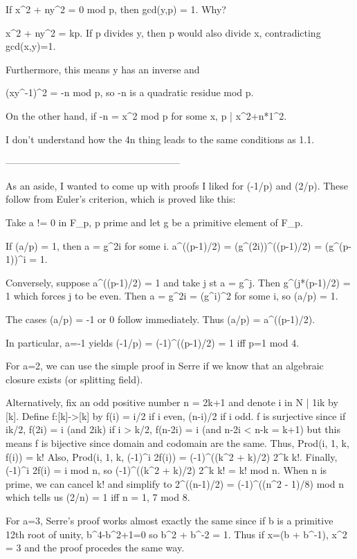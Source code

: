 If x^2 + ny^2 = 0 mod p, then gcd(y,p) = 1. Why?

x^2 + ny^2 = kp. If p divides y, then p would also divide x,
contradicting gcd(x,y)=1.

Furthermore, this means y has an inverse and

(xy^-1)^2 = -n mod p, so -n is a quadratic residue mod p.

On the other hand, if -n = x^2 mod p for some x, p | x^2+n*1^2.

I don't understand how the 4n thing leads to the same conditions as 1.1.

------------------------------------------------------

As an aside, I wanted to come up with proofs I liked for (-1/p) and (2/p). These follow from Euler's criterion, which is proved like this:

  Take a != 0 in F_p, p prime and let g be a primitive element of F_p.

  If (a/p) = 1, then a = g^{2i} for some i.
  a^((p-1)/2) = (g^(2i))^((p-1)/2) = (g^(p-1))^i = 1.

  Conversely, suppose a^((p-1)/2) = 1 and take j st a = g^j.
  Then g^(j*(p-1)/2) = 1 which forces j to be even. Then a = g^2i = (g^i)^2 for some i, so (a/p) = 1.

  The cases (a/p) = -1 or 0 follow immediately. Thus (a/p) = a^((p-1)/2).

In particular, a=-1 yields (-1/p) = (-1)^((p-1)/2) = 1 iff p=1 mod 4.

For a=2, we can use the simple proof in Serre if we know that an algebraic closure exists (or splitting field).

Alternatively, fix an odd positive number n = 2k+1 and denote {i in N | 1\leq i\leq k} by [k].
Define f:[k]->[k] by f(i) = i/2 if i even, (n-i)/2 if i odd.
f is surjective since if i\leq k/2, f(2i) = i (and 2i\leq k)
                      if i > k/2, f(n-2i) = i (and n-2i < n-k = k+1)
but this means f is bijective since domain and codomain are the same.
Thus, Prod(i, 1, k, f(i)) = k!
Also, Prod(i, 1, k, (-1)^i 2f(i)) = (-1)^((k^2 + k)/2) 2^k k!.
Finally, (-1)^i 2f(i) = i mod n, so (-1)^((k^2 + k)/2) 2^k k! = k! mod n.
When n is prime, we can cancel k! and simplify to
2^((n-1)/2) = (-1)^((n^2 - 1)/8) mod n which tells us (2/n) = 1 iff n = 1, 7 mod 8.

For a=3, Serre's proof works almost exactly the same since if b is a primitive 12th root of unity, b^4-b^2+1=0 so b^2 + b^-2 = 1. Thus if x=(b + b^-1), x^2 = 3 and the proof procedes the same way.

